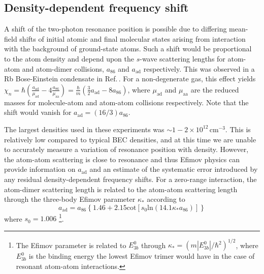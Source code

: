 \subsection{Density-dependent frequency shift}
A shift of the two-photon resonance position is possible due to differing mean-field shifts of initial atomic and final molecular states arising from interaction with the background of ground-state atoms.
Such a shift would be proportional to the atom density and depend upon the $s$-wave scattering lengths for atom-atom and atom-dimer collisions, $a_{86}$ and $a_{\text{ad}}$ respectively.
This was observed in a Rb Bose-Einstein condensate in Ref.\,\hl{\cite{wfh00}}. 
For a non-degenerate gas, this effect yields $\chi_n=\hbar (\frac{a_{\text{ad}}}{\mu_{\text{ad}}}-4\frac{a_{86}}{\mu_{\text{aa}}})=\frac{\hbar}{m} (\frac{3 }{2}a_{\text{ad}}-8 a_{86})$, where $\mu_{\text{ad}}$ and $\mu_{\text{aa}}$ are the reduced masses for molecule-atom and atom-atom collisions respectively.
Note that the shift would vanish for $a_{\text{ad}}=(16/3) a_{86}$.

The largest densities used in these experiments was $\sim 1-2\times 10^{12}\,\mathrm{cm}^{-3}$.
This is relatively low compared to typical BEC densities, and at this time we are unable to accurately measure a variation of resonance position with density.
However, the atom-atom scattering is close to resonance and thus Efimov physics can provide information on $a_{\text{ad}}$ \hl{\cite{bha07,nen17}} and an estimate of the systematic error introduced by any residual density-dependent frequency shifts.
For a zero-range interaction, the atom-dimer scattering length is related to the atom-atom scattering length through the three-body Efimov parameter $\kappa_*$ according to \hl{\cite{bha07}}
\begin{equation}\label{Eq:EfimovMoleculAtomScatteringLength}
  a_{\text{ad}}=a_{86}\left\{1.46 + 2.15 \mathrm{cot}[s_0 \mathrm{ln} (14.1\kappa_* a_{86}) ]\right\}
\end{equation}
where $s_0=1.006$ \footnote{The Efimov parameter is related to $E^0_{3b}$ through $\kappa_*=(m|E^0_{3b}|/\hbar^2)^{1/2}$, where $E^0_{3b}$ is the binding energy the lowest Efimov trimer would have in the case of resonant atom-atom interactions.}.

